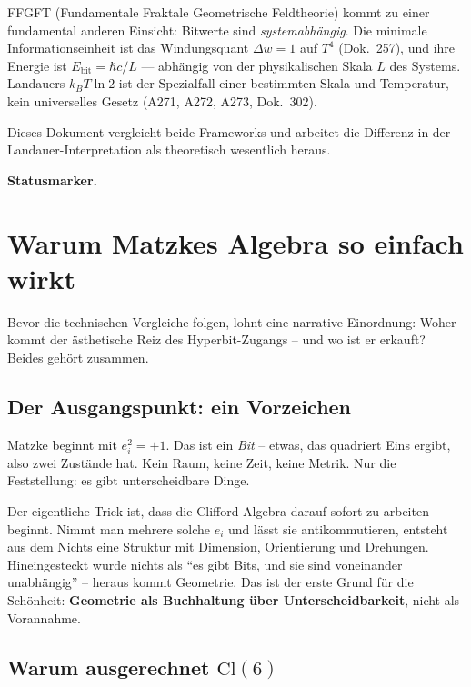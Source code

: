 FFGFT (Fundamentale Fraktale Geometrische Feldtheorie) kommt zu einer fundamental
anderen Einsicht: Bitwerte sind \emph{systemabhängig}.
Die minimale Informationseinheit ist das Windungsquant $\Delta w = 1$ auf $T^4$
(Dok.\ 257), und ihre Energie ist $E_{\mathrm{bit}} = \hbar c/L$ — abhängig von der
physikalischen Skala $L$ des Systems.
Landauers $k_B T \ln 2$ ist der Spezialfall einer bestimmten Skala und Temperatur,
kein universelles Gesetz (A271, A272, A273, Dok.\ 302).

Dieses Dokument vergleicht beide Frameworks und arbeitet die Differenz in der
Landauer-Interpretation als theoretisch wesentlich heraus.



\medskip\noindent\textbf{Statusmarker.}


\section{Warum Matzkes Algebra so einfach wirkt}

Bevor die technischen Vergleiche folgen, lohnt eine narrative Einordnung:
Woher kommt der ästhetische Reiz des Hyperbit-Zugangs -- und wo ist er
erkauft? Beides gehört zusammen.

\subsection*{Der Ausgangspunkt: ein Vorzeichen}

Matzke beginnt mit $e_i^2 = +1$. Das ist ein \emph{Bit} -- etwas, das
quadriert Eins ergibt, also zwei Zustände hat. Kein Raum, keine Zeit,
keine Metrik. Nur die Feststellung: es gibt unterscheidbare Dinge.

Der eigentliche Trick ist, dass die Clifford-Algebra darauf sofort zu
arbeiten beginnt. Nimmt man mehrere solche $e_i$ und lässt sie
antikommutieren, entsteht aus dem Nichts eine Struktur mit Dimension,
Orientierung und Drehungen. Hineingesteckt wurde nichts als
\enquote{es gibt Bits, und sie sind voneinander unabhängig} --
heraus kommt Geometrie. Das ist der erste Grund für die Schönheit:
\textbf{Geometrie als Buchhaltung über Unterscheidbarkeit},
nicht als Vorannahme.

\subsection*{Warum ausgerechnet $\mathrm{Cl}(6)$}

